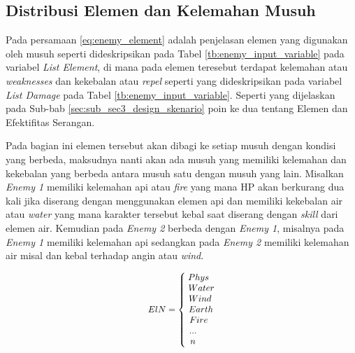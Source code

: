 \subsection{Distribusi Elemen dan Kelemahan Musuh}
\label{sec:sub_sec3_enemy_weak}
\vspace{1ex}

Pada persamaan \ref{eq:enemy_element} adalah penjelasan elemen yang digunakan oleh musuh seperti dideskripsikan pada Tabel \ref{tb:enemy_input_variable} pada variabel \textit{List Element}, di mana pada elemen teresebut terdapat kelemahan atau \textit{weaknesses} dan kekebalan atau \textit{repel} seperti yang dideskripsikan pada variabel \textit{List Damage} pada Tabel \ref{tb:enemy_input_variable}.  Seperti yang dijelaskan pada Sub-bab \ref{sec:sub_sec3_design_skenario} poin ke dua tentang Elemen dan Efektifitas Serangan. 
\vspace{1ex}

Pada bagian ini elemen tersebut akan dibagi ke setiap musuh dengan kondisi yang berbeda, maksudnya nanti akan ada musuh yang memiliki kelemahan dan kekebalan yang berbeda antara musuh satu dengan musuh yang lain. Misalkan \textit{Enemy 1} memiliki kelemahan api atau \textit{fire} yang mana HP akan berkurang dua kali jika diserang dengan menggunakan elemen api dan memiliki kekebalan air atau \textit{water} yang mana karakter tersebut kebal saat diserang dengan \textit{skill} dari elemen air. Kemudian pada \textit{Enemy 2} berbeda dengan \textit{Enemy 1}, misalnya pada \textit{Enemy 1} memiliki kelemahan api sedangkan pada \textit{Enemy 2} memiliki kelemahan air misal dan kebal terhadap angin atau \textit{wind}.
\vspace{1ex}

\begin{equation}\label{eq:enemy_element}
\resizebox{0.2\textwidth}{!}{%
	$ElN = \left\{\begin{matrix}
	\hspace{-0.34em} Phys \\ 
	\hspace{0.3em} Water \\
	\hspace{0.0em} Wind \\
	\hspace{0.2em} Earth \\
	\hspace{-0.3em} Fire \\
	\hspace{-1.6em} ... \\
	\hspace{-1.6em} n
	\end{matrix}\right.$%
}
\end{equation}

